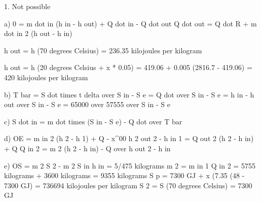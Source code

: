 1. Not possible 

a) 0 = m dot in (h in - h out) + Q dot in - Q dot out
   Q dot out = Q dot R + m dot in 2 (h out - h in)

   h out = h (70 degrees Celsius) = 236.35 kilojoules per kilogram

   h out = h (20 degrees Celsius + x * 0.05) = 419.06 + 0.005 (2816.7 - 419.06) = 420 kilojoules per kilogram

b) T bar = S dot times t delta over S in - S e = Q dot over S in - S e = h in - h out over S in - S e = 65000 over 57555 over S in - S e

c) S dot in = m dot times (S in - S e) - Q dot over T bar

d) OE = m in 2 (h 2 - h 1) + Q - x^00
   h 2 out 2 - h in 1 = Q out 2 (h 2 - h in) + Q
   Q in 2 = m 2 (h 2 - h in) - Q over h out 2 - h in

e) OS = m 2 S 2 - m 2 S in
   h in = 5/475 kilograms
   m 2 = m in 1 Q in 2 = 5755 kilograms + 3600 kilograms = 9355 kilograms
   S p = 7300 GJ + x (7.35 (48 - 7300 GJ) = 736694 kilojoules per kilogram
   S 2 = S (70 degrees Celsius) = 7300 GJ